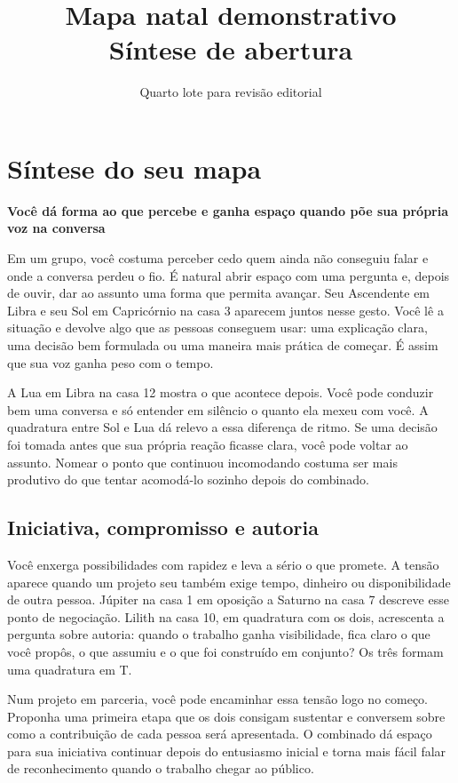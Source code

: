 \documentclass[11pt,a4paper]{article}
\title{Mapa natal demonstrativo\\Síntese de abertura}
\author{Quarto lote para revisão editorial}
\date{}
\newcommand{\subtituloleitura}[1]{\textbf{#1}\par\nopagebreak[4]}
\begin{document}
\maketitle

\section*{Síntese do seu mapa}
\subtituloleitura{Você dá forma ao que percebe e ganha espaço quando põe sua própria voz na conversa}

Em um grupo, você costuma perceber cedo quem ainda não conseguiu falar e onde a conversa perdeu o fio. É natural abrir espaço com uma pergunta e, depois de ouvir, dar ao assunto uma forma que permita avançar. Seu Ascendente em Libra e seu Sol em Capricórnio na casa 3 aparecem juntos nesse gesto. Você lê a situação e devolve algo que as pessoas conseguem usar: uma explicação clara, uma decisão bem formulada ou uma maneira mais prática de começar. É assim que sua voz ganha peso com o tempo.

A Lua em Libra na casa 12 mostra o que acontece depois. Você pode conduzir bem uma conversa e só entender em silêncio o quanto ela mexeu com você. A quadratura entre Sol e Lua dá relevo a essa diferença de ritmo. Se uma decisão foi tomada antes que sua própria reação ficasse clara, você pode voltar ao assunto. Nomear o ponto que continuou incomodando costuma ser mais produtivo do que tentar acomodá-lo sozinho depois do combinado.

\subsection*{Iniciativa, compromisso e autoria}

Você enxerga possibilidades com rapidez e leva a sério o que promete. A tensão aparece quando um projeto seu também exige tempo, dinheiro ou disponibilidade de outra pessoa. Júpiter na casa 1 em oposição a Saturno na casa 7 descreve esse ponto de negociação. Lilith na casa 10, em quadratura com os dois, acrescenta a pergunta sobre autoria: quando o trabalho ganha visibilidade, fica claro o que você propôs, o que assumiu e o que foi construído em conjunto? Os três formam uma quadratura em T.

Num projeto em parceria, você pode encaminhar essa tensão logo no começo. Proponha uma primeira etapa que os dois consigam sustentar e conversem sobre como a contribuição de cada pessoa será apresentada. O combinado dá espaço para sua iniciativa continuar depois do entusiasmo inicial e torna mais fácil falar de reconhecimento quando o trabalho chegar ao público.
\end{document}
